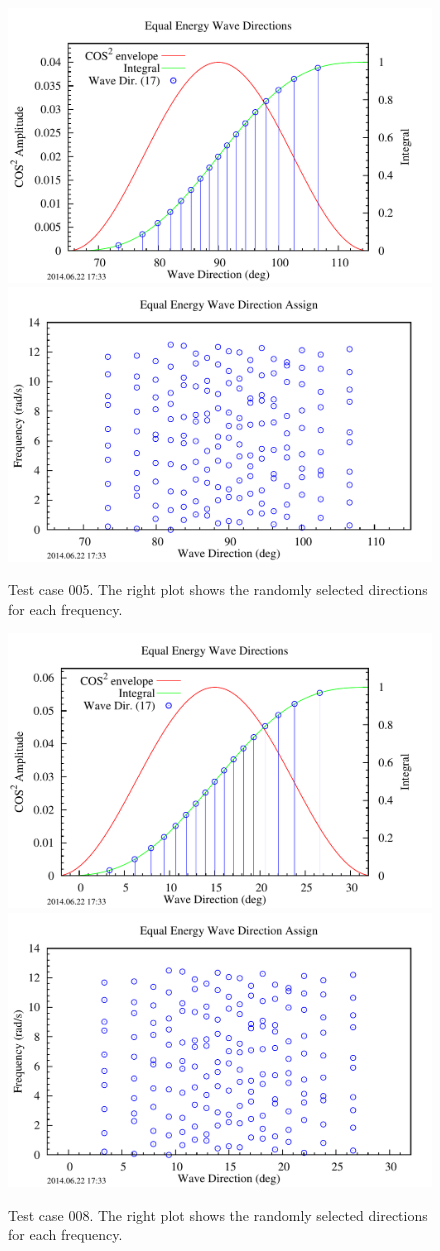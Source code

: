 \begin{figure}
   \centering
   \includegraphics[width=.47\linewidth]{chaps/figures/WaveDirTest/WavesTest_005--equal_energy_disc.pdf}
   \includegraphics[width=.47\linewidth]{chaps/figures/WaveDirTest/WavesTest_005--wavedir_assign.pdf}
   \caption{Test case 005.  The right plot shows the randomly selected directions for each frequency.\label{fig:MultiDir:WavesTest005}}
\end{figure}

\begin{figure}
   \centering
   \includegraphics[width=.47\linewidth]{chaps/figures/WaveDirTest/WavesTest_008--equal_energy_disc.pdf}
   \includegraphics[width=.47\linewidth]{chaps/figures/WaveDirTest/WavesTest_008--wavedir_assign.pdf}
   \caption{Test case 008.  The right plot shows the randomly selected directions for each frequency.\label{fig:MultiDir:WavesTest008}}
\end{figure}



